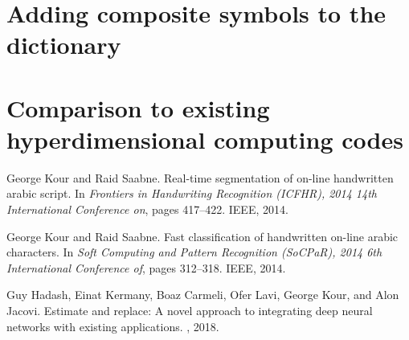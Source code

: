 \documentclass{article}
\begin{document}
\section{Adding composite symbols to the dictionary}

\section{Comparison to existing hyperdimensional computing codes}




  


\begin{thebibliography}{1}

George Kour and Raid Saabne.
\newblock Real-time segmentation of on-line handwritten arabic script.
\newblock In {\em Frontiers in Handwriting Recognition (ICFHR), 2014 14th
  International Conference on}, pages 417--422. IEEE, 2014.

George Kour and Raid Saabne.
\newblock Fast classification of handwritten on-line arabic characters.
\newblock In {\em Soft Computing and Pattern Recognition (SoCPaR), 2014 6th
  International Conference of}, pages 312--318. IEEE, 2014.

Guy Hadash, Einat Kermany, Boaz Carmeli, Ofer Lavi, George Kour, and Alon
  Jacovi.
\newblock Estimate and replace: A novel approach to integrating deep neural
  networks with existing applications.
, 2018.

\end{thebibliography}
\end{document}
